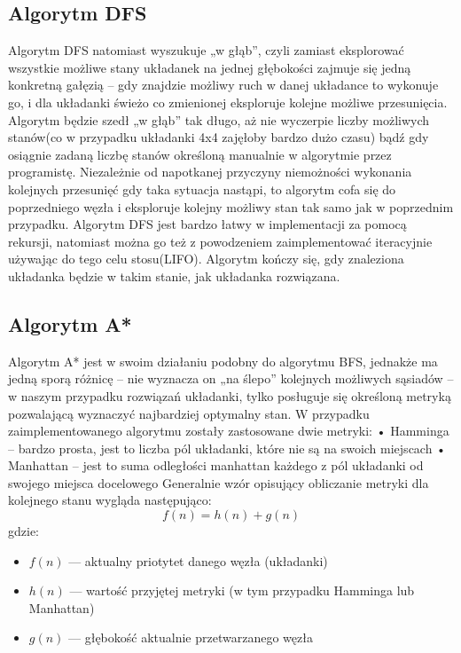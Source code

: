 \documentclass{classrep}
\begin{document}
\subsection{Algorytm DFS}
Algorytm DFS natomiast wyszukuje „w głąb”, czyli zamiast eksplorować wszystkie możliwe stany układanek na jednej głębokości zajmuje się jedną konkretną gałęzią – gdy znajdzie możliwy ruch w danej układance to wykonuje go, i dla układanki świeżo co zmienionej eksploruje kolejne możliwe przesunięcia. Algorytm będzie szedł „w głąb” tak długo, aż nie wyczerpie liczby możliwych stanów(co w przypadku układanki 4x4 zajęłoby bardzo dużo czasu) bądź gdy osiągnie zadaną liczbę stanów określoną manualnie w algorytmie przez programistę. Niezależnie od napotkanej przyczyny niemożności wykonania kolejnych przesunięć gdy taka sytuacja nastąpi, to algorytm cofa się do poprzedniego węzła i eksploruje kolejny możliwy stan tak samo jak w poprzednim przypadku. Algorytm DFS jest bardzo łatwy w implementacji za pomocą rekursji, natomiast można go też z powodzeniem zaimplementować iteracyjnie używając do tego celu stosu(LIFO). Algorytm kończy się, gdy znaleziona układanka będzie w takim stanie, jak układanka rozwiązana.

\subsection{Algorytm A*}
Algorytm A* jest w swoim działaniu podobny do algorytmu BFS, jednakże ma jedną sporą różnicę – nie wyznacza on „na ślepo” kolejnych możliwych sąsiadów – w naszym przypadku rozwiązań układanki, tylko posługuje się określoną metryką pozwalającą wyznaczyć najbardziej optymalny stan. W przypadku zaimplementowanego algorytmu zostały zastosowane dwie metryki:
    • Hamminga – bardzo prosta, jest to liczba pól układanki, które nie są na swoich miejscach
    • Manhattan – jest to suma odległości manhattan każdego z pól układanki od swojego miejsca docelowego
Generalnie wzór opisujący obliczanie metryki dla kolejnego stanu wygląda następująco:
\begin{equation}
f(n) = h(n) + g(n)
\end{equation}
gdzie:
\begin{itemize}
\item \(f(n)\) --- aktualny priotytet danego węzła (układanki)
\item \(h(n)\) --- wartość przyjętej metryki (w tym przypadku Hamminga lub Manhattan)
\item \(g(n)\) --- głębokość aktualnie przetwarzanego węzła
\end{itemize}
\end{document}

